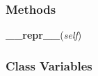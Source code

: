 
  \subsubsection{Methods}

    \label{config_db:User:__repr__}

    \vspace{0.5ex}

\hspace{.8\funcindent}\begin{boxedminipage}{\funcwidth}

    \raggedright \textbf{\_\_repr\_\_}(\textit{self})

\setlength{\parskip}{2ex}
\setlength{\parskip}{1ex}
    \end{boxedminipage}



  \subsubsection{Class Variables}

